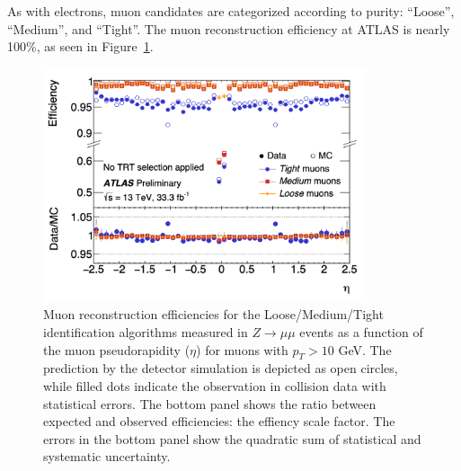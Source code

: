 As with electrons, muon candidates are categorized according to purity: ``Loose'', ``Medium'', and ``Tight''.
The muon reconstruction efficiency at ATLAS is nearly 100\%, as seen in Figure~\ref{fig:muon_efficiency}.

\begin{figure}
	\centering
	\includegraphics[width=0.85\textwidth]{muon_efficiency}
	\caption{
	Muon reconstruction efficiencies for the Loose/Medium/Tight identification algorithms measured in $Z\rightarrow \mu\mu$ events as a function of the muon pseudorapidity ($\eta$) for muons with $p_T > 10$\; GeV. The prediction by the detector simulation is depicted as open circles, while filled dots indicate the observation in collision data with statistical errors.
	The bottom panel shows the ratio between expected and observed efficiencies: the effiency scale factor.
	The errors in the bottom panel show the quadratic sum of statistical and systematic uncertainty.
	    \cite{Marchese:2018vrd}
	}
	\label{fig:muon_efficiency}
\end{figure}